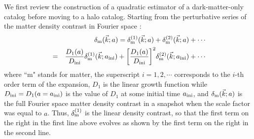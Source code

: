 \documentclass[prd,amsmath,amssymb,floatfix,superscriptaddress,nofootinbib,twocolumn]{revtex4-1}
\def\bea{\begin{eqnarray}}
\def\eea{\end{eqnarray}}
\newcommand{\ini}{\rm ini}
\newcommand{\vs}{\nonumber\\}
\newcommand{\vk}{\vec{k}}
\newcommand{\eql}[1]{\label{eq:#1}}
\begin{document}
\noindent We first review the construction of a quadratic estimator of a dark-matter-only catalog \cite{Li:2020fir} before moving to a halo catalog. Starting from the perturbative series of the matter density contrast in Fourier space \cite{Jain:1994sop}\cite{Bernardeau:2002rev}:
\bea
&&\delta_{\rm m}(\vk;a)=\delta^{(1)}_{\rm m}(\vk;a)+\delta^{(2)}_{\rm m}(\vk;a)+\cdots\vs
&=&\frac{D_1(a)}{D_{\rm ini}}\delta^{(1)}_{\rm m}(\vk;a_{\ini})+\bigg[\frac{D_1(a)}{D_{\rm ini}}\bigg]^2\delta^{(2)}_{\rm m}(\vk;a_{\ini})+\cdots \eql{tayl}
\eea 
where ``m" stands for matter, the superscript $i=1,2,\cdots$ corresponds to the $i$-th order term of the expansion, $D_1$ is the linear growth function while $D_{\ini} = D_1(a=a_{\ini})$ is the value of $D_1$ at some initial time $a_{\rm ini}$, and $\delta_{\rm m}(\vk;a)$ is the full Fourier space matter density contrast in a snapshot when the scale factor was equal to $a$. Thus, $\delta_{\rm m}^{(1)}$ is the linear density contrast, so that the first term on the right in the first line above evolves as shown by the first term on the right in the second line.
\end{document}
